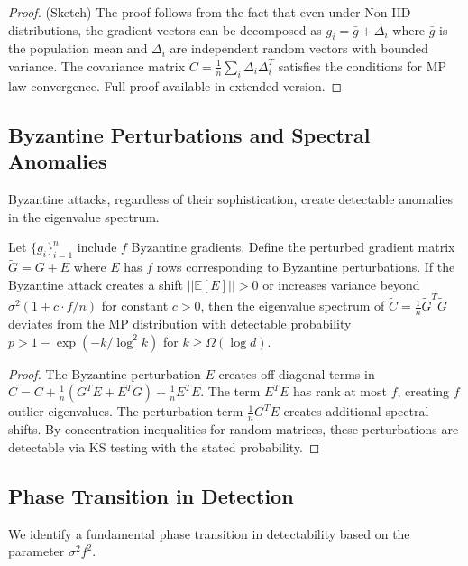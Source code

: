 \documentclass[runningheads]{llncs}
\begin{document}
\begin{proof}
(Sketch) The proof follows from the fact that even under Non-IID distributions, the gradient vectors can be decomposed as $g_i = \bar{g} + \Delta_i$ where $\bar{g}$ is the population mean and $\Delta_i$ are independent random vectors with bounded variance. The covariance matrix $C = \frac{1}{n}\sum_{i} \Delta_i \Delta_i^T$ satisfies the conditions for MP law convergence. Full proof available in extended version.
\end{proof}

\subsection{Byzantine Perturbations and Spectral Anomalies}

Byzantine attacks, regardless of their sophistication, create detectable anomalies in the eigenvalue spectrum.

\begin{theorem}
Let $\{g_i\}_{i=1}^n$ include $f$ Byzantine gradients. Define the perturbed gradient matrix $\tilde{G} = G + E$ where $E$ has $f$ rows corresponding to Byzantine perturbations. If the Byzantine attack creates a shift $||\mathbb{E}[E]|| > 0$ or increases variance beyond $\sigma^2(1 + c \cdot f/n)$ for constant $c > 0$, then the eigenvalue spectrum of $\tilde{C} = \frac{1}{n}\tilde{G}^T \tilde{G}$ deviates from the MP distribution with detectable probability $p > 1 - \exp(-k/\log^2 k)$ for $k \geq \Omega(\log d)$.
\end{theorem}

\begin{proof}
The Byzantine perturbation $E$ creates off-diagonal terms in $\tilde{C} = C + \frac{1}{n}(G^T E + E^T G) + \frac{1}{n}E^T E$. The term $E^T E$ has rank at most $f$, creating $f$ outlier eigenvalues. The perturbation term $\frac{1}{n}G^T E$ creates additional spectral shifts. By concentration inequalities for random matrices, these perturbations are detectable via KS testing with the stated probability.
\end{proof}

\subsection{Phase Transition in Detection}

We identify a fundamental phase transition in detectability based on the parameter $\sigma^2 f^2$.
\end{document}
